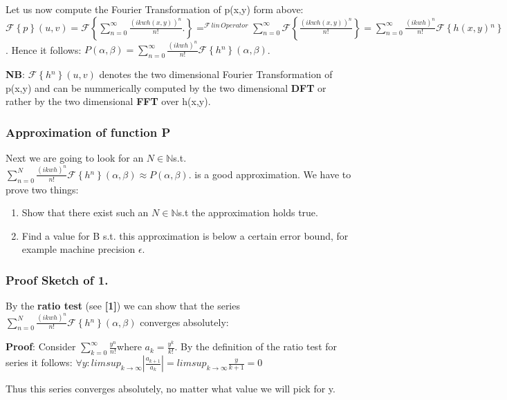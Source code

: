 Let us now compute the Fourier Transformation of p(x,y) form above:$\mathcal{F}\left\{ p\right\} (u,v)=\mathcal{F}\left\{ \sum_{n=0}^{\infty}\frac{(ikwh(x,y))^{n}}{n!}.\right\} =^{\mathcal{F}\, lin\, Operator}\sum_{n=0}^{\infty}\mathcal{F}\left\{ \frac{(ikwh(x,y))^{n}}{n!}\right\} =\sum_{n=0}^{\infty}\frac{(ikwh)^{n}}{n!}\mathcal{F}\left\{ h(x,y){}^{n}\right\} $.
Hence it follows: $P(\alpha,\beta)=\sum_{n=0}^{\infty}\frac{(ikwh)^{n}}{n!}\mathcal{F}\left\{ h{}^{n}\right\} (\alpha,\beta)$.

\textbf{NB}: $\mathcal{F}\left\{ h{}^{n}\right\} (u,v)$ denotes the
two dimensional Fourier Transformation of p(x,y) and can be nummerically
computed by the two dimensional \textbf{DFT} or rather by the two
dimensional \textbf{FFT} over h(x,y). 


\subsubsection{Approximation of function P}

Next we are going to look for an $N\mathbb{\in N}$s.t. $\sum_{n=0}^{N}\frac{(ikwh)^{n}}{n!}\mathcal{F}\left\{ h{}^{n}\right\} (\alpha,\beta)\approx P(\alpha,\beta)$.
is a good approximation. We have to prove two things:
\begin{enumerate}
\item Show that there exist such an $N\mathbb{\in N}$s.t the approximation
holds true.
\item Find a value for B s.t. this approximation is below a certain error
bound, for example machine precision $\epsilon$. 
\end{enumerate}

\subsubsection{Proof Sketch of 1.}

By the \textbf{ratio test} (see \textbf{{[}1{]}}) we can show that
the series $\sum_{n=0}^{N}\frac{(ikwh)^{n}}{n!}\mathcal{F}\left\{ h{}^{n}\right\} (\alpha,\beta)$
converges absolutely:

\textbf{Proof}: Consider $\sum_{k=0}^{\infty}\frac{y^{n}}{n!}$where
$a_{k}=\frac{y^{k}}{k!}$. By the definition of the ratio test for
series it follows: $\forall y:$$limsup_{k\rightarrow\infty}|\frac{a_{k+1}}{a_{k}}|=limsup_{k\rightarrow\infty}\frac{y}{k+1}=0$ 

Thus this series converges absolutely, no matter what value we will
pick for y.


